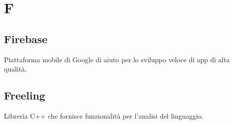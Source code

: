 \section{F}	\label{F}
	
	\subsection{Firebase}	\label{firebase}
	Piattaforma mobile di Google di aiuto per lo sviluppo veloce di app di alta qualità.
	
	\subsection{Freeling}	\label{freeling}
	Libreria C++ che fornisce funzionalità per l'analisi del linguaggio.